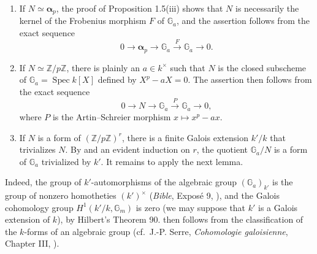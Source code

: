 \begin{enumerate}
\item[\rm(a)] If \(N\simeq\boldsymbol\alpha_p\), the proof of
  Proposition 1.5(iii) shows that \(N\) is necessarily the kernel of the
  Frobenius morphism \(F\) of \(\mathbb G_a\), and the assertion follows from
  the exact sequence
  \[
    0\longrightarrow\boldsymbol\alpha_p\longrightarrow\mathbb G_a
      \xrightarrow{F}\mathbb G_a\longrightarrow0.
  \]
\item[\rm(b)] If \(N\simeq\mathbb Z/p\mathbb Z\), there is plainly an
  \(a\in k^\times\) such that \(N\) is the closed subscheme of
  \(\mathbb G_a=\operatorname{Spec}k[X]\) defined by
  \(X^p-aX=0\).  The assertion then follows from the exact sequence
  \[
    0\longrightarrow N\longrightarrow\mathbb G_a
      \xrightarrow{P}\mathbb G_a\longrightarrow0,
  \]
  where \(P\) is the Artin--Schreier morphism \(x\mapsto x^p-ax\).
\item[\rm(c)] If \(N\) is a form of \((\mathbb Z/p\mathbb Z)^r\), there is a
  finite Galois extension \(k'/k\) that trivializes \(N\).  By  and an
  evident induction on \(r\), the quotient \(\mathbb G_a/N\) is a form of
  \(\mathbb G_a\) trivialized by \(k'\).  It remains to apply the next lemma.
\end{enumerate}




Indeed, the group of \(k'\)-automorphisms of the algebraic group
\((\mathbb G_a)_{k'}\) is the group of nonzero homotheties
\((k')^\times\) (\textit{Bible}, Exposé 9, ), and the Galois
cohomology group \(H^1(k'/k,\mathbb G_m)\) is zero (we may suppose that
\(k'\) is a Galois extension of \(k\)), by Hilbert's Theorem 90.
 then follows from the classification of the \(k\)-forms
of an algebraic group (cf.\ J.-P. Serre, \textit{Cohomologie
galoisienne}, Chapter III, ).

